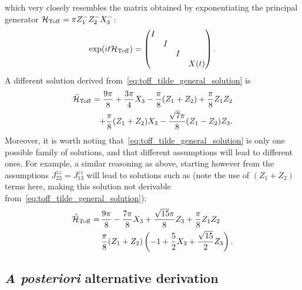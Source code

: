 which very closely resembles the matrix obtained by exponentiating the principal generator
$\mathcal H_{\operatorname{Toff}} = \pi Z_1^- Z_2^- X_3^-$:
\begin{equation}
	\exp(i t \mathcal H_{\operatorname{Toff}}) =
	\begin{pmatrix}
		I & & & \\
		& I & & \\
		& & I & \\
		& & & X(t)
	\end{pmatrix}.
\end{equation}
A different solution derived from~\cref{eq:toff_tilde_general_solution} is
\begin{equation}
\begin{aligned}
	\tilde{\mathcal H}_{\operatorname{Toff}} =
	\frac{9\pi}{8} + \frac{3\pi}{4} X_3 - \frac{\pi}{8} (Z_1 + Z_2)
	+ \frac{\pi}{8} Z_1 Z_2 \\
	+ \frac{\pi}{8} (Z_1 + Z_2) X_3
	- \frac{\sqrt7 \pi}{8} (Z_1 - Z_2) Z_3.
\end{aligned}
\end{equation}
Moreover, it is worth noting that~\cref{eq:toff_tilde_general_solution} is only one possible family of solutions, and that different assumptions will lead to different ones.
For example, a similar reasoning as above, starting however from the assumptions $J_{23}^{zz}=J_{13}^{zz}$ will lead to solutions such as (note the use of $(Z_1+Z_2)$ terms here, making this solution not derivable from~\cref{eq:toff_tilde_general_solution}):
\begin{equation}
\begin{aligned}
	\tilde{{\mathcal{H}}}_{\operatorname{Toff}}{} =\,
		&\frac{9\pi}{8} - \frac{7\pi}{8}X_3 + \frac{\sqrt{15}\pi}{8} Z_3 + \frac{\pi}{8}Z_1 Z_2 \\
		&\frac{\pi}{8}(Z_1+Z_2)\left(-1+\frac{5}{2}X_3 + \frac{\sqrt{15}}{2}Z_3\right).
\end{aligned}
\end{equation}

\subsection{\textit{A posteriori} alternative derivation}
\label{sec:toffoli_posteriori_derivation}

